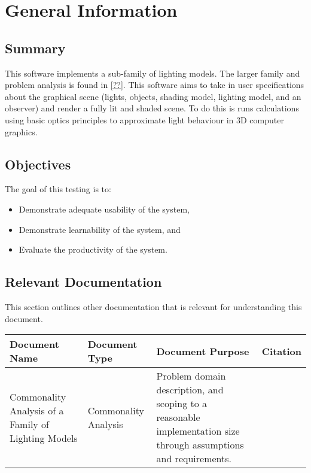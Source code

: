 \documentclass[12pt, titlepage]{article}
\begin{document}
\section{General Information}

\subsection{Summary}
This software implements a sub-family of lighting models. The larger family and 
problem analysis is found in \ref{??}. This software aims to take in user 
specifications about the graphical scene (lights, objects, shading model, 
lighting model, and an observer) and render a fully lit and shaded scene. To do 
this is runs calculations using basic optics principles to approximate light 
behaviour in 3D computer graphics.

\subsection{Objectives}
The goal of this testing is to:

\begin{itemize}
	\item Demonstrate adequate usability of the system,
	\item Demonstrate learnability of the system, and
	\item Evaluate the productivity of the system.
\end{itemize}
%

\pagebreak
\subsection{Relevant Documentation}
This section outlines other documentation that is relevant for understanding 
this document.
\begin{table}[h]
	\begin{tabular}{|p{3.5cm}|p{3cm}|p{5cm}|l|}
		\hline
	\textbf{Document Name} & \textbf{Document Type} & \textbf{Document Purpose} 
	& \textbf{Citation} \\
		\hline
		Commonality Analysis of a Family of Lighting Models& Commonality 
		Analysis & Problem domain description, and scoping to a reasonable 
		implementation size through assumptions and requirements. & \\ 
		\hline
	\end{tabular}
\end{table}
\end{document}
